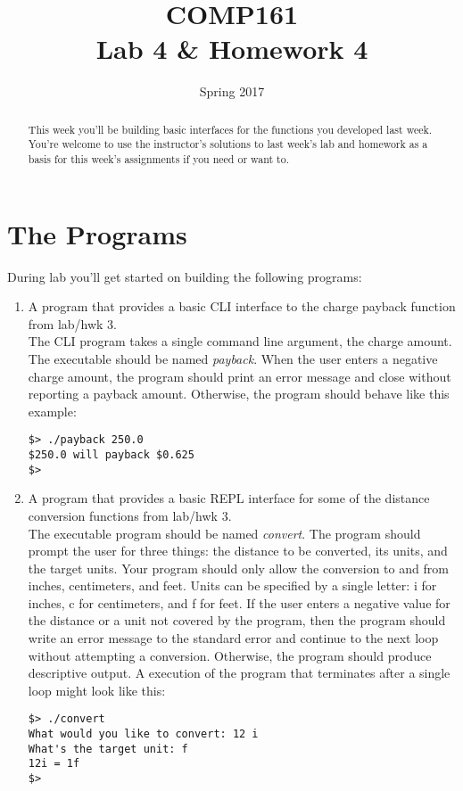 \documentclass[]{tufte-handout}
\title{COMP161 \\ Lab 4 \& Homework 4}
\author{}
\date{Spring 2017}
\begin{document}
\maketitle
\thispagestyle{empty}

\begin{abstract}
This week you'll be building basic interfaces for the functions you developed last week. You're welcome to use the instructor's solutions to last week's lab and homework as a basis for this week's assignments if you need or want to.
\end{abstract}

\section{The Programs}

During lab you'll get started on building the following programs:
\begin{enumerate}
\item A program that provides a basic CLI interface to the charge payback function from lab/hwk 3. \\
The CLI program takes a single command line argument, the charge amount. The executable should be named \textit{payback}. When the user enters a negative charge amount, the program should print an error message and close without reporting a payback amount. Otherwise, the program should behave like this example:
\begin{verbatim}
$> ./payback 250.0
$250.0 will payback $0.625
$>
\end{verbatim}


\item A program that provides a basic REPL interface for some of the distance conversion functions from lab/hwk 3. \\
The executable program should be named \textit{convert}. The program should prompt the user for three things: the distance to be converted, its units, and the target units. Your program should only allow the conversion to and from inches, centimeters, and feet. Units can be specified by a single letter: i for inches, c for centimeters, and f for feet. If the user enters a negative value for the distance or a unit not covered by the program, then the program should write an error message to the standard error and continue to the next loop without attempting a conversion. Otherwise, the program should produce descriptive output. A execution of the program that terminates after a single loop might look like this:
\begin{verbatim}
$> ./convert
What would you like to convert: 12 i
What's the target unit: f
12i = 1f
$>
\end{verbatim}
\end{enumerate}
\end{document}
